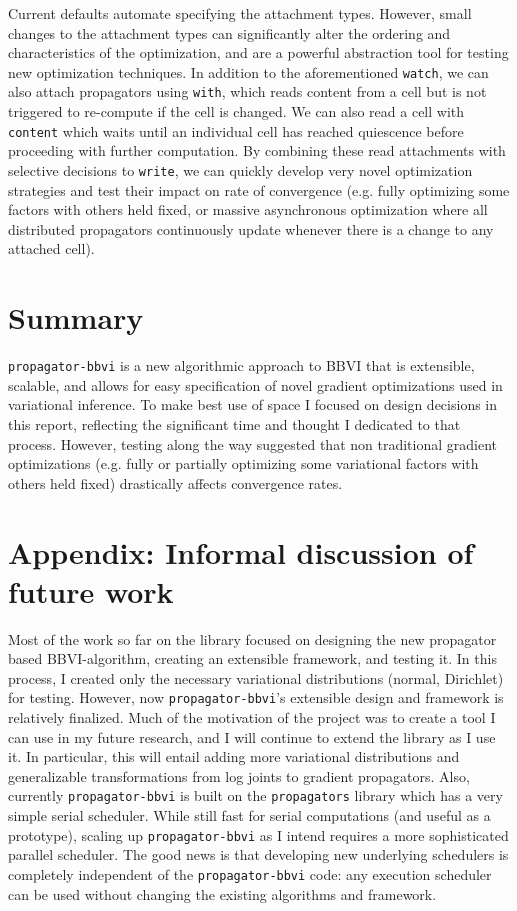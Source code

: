 \documentclass[12pt]{article}
\begin{document}
Current defaults automate specifying the attachment types. However,
small changes to the attachment types can significantly alter the
ordering and characteristics of the optimization, and are a powerful
abstraction tool for testing new optimization techniques. In addition
to the aforementioned \texttt{watch}, we can also attach propagators
using \texttt{with}, which reads content from a cell but is not
triggered to re-compute if the cell is changed. We can also read a
cell with \texttt{content} which waits until an individual cell has
reached quiescence before proceeding with further computation. By
combining these read attachments with selective decisions to
\texttt{write}, we can quickly develop very novel optimization
strategies and test their impact on rate of convergence (e.g. fully
optimizing some factors with others held fixed, or massive
asynchronous optimization where all distributed propagators
continuously update whenever there is a change to any attached cell).

\section{Summary}

\texttt{propagator-bbvi} is a new algorithmic approach to BBVI that is
extensible, scalable, and allows for easy specification of novel
gradient optimizations used in variational inference. To make best use
of space I focused on design decisions in this report, reflecting the
significant time and thought I dedicated to that process. However,
testing along the way suggested that non traditional gradient
optimizations (e.g. fully or partially optimizing some variational
factors with others held fixed) drastically affects convergence rates.

\appendix
\section{Appendix: Informal discussion of future work}

Most of the work so far on the library focused on designing the new
propagator based BBVI-algorithm, creating an extensible framework, and
testing it. In this process, I created only the necessary variational
distributions (normal, Dirichlet) for testing. However, now
\texttt{propagator-bbvi}'s extensible design and framework is
relatively finalized. Much of the motivation of the project was to
create a tool I can use in my future research, and I will continue to
extend the library as I use it. In particular, this will entail adding
more variational distributions and generalizable transformations from
log joints to gradient propagators. Also, currently
\texttt{propagator-bbvi} is built on the \texttt{propagators} library
which has a very simple serial scheduler. While still fast for serial
computations (and useful as a prototype), scaling up
\texttt{propagator-bbvi} as I intend requires a more sophisticated
parallel scheduler. The good news is that developing new underlying
schedulers is completely independent of the \texttt{propagator-bbvi}
code: any execution scheduler can be used without changing the
existing algorithms and framework.


\end{document}
